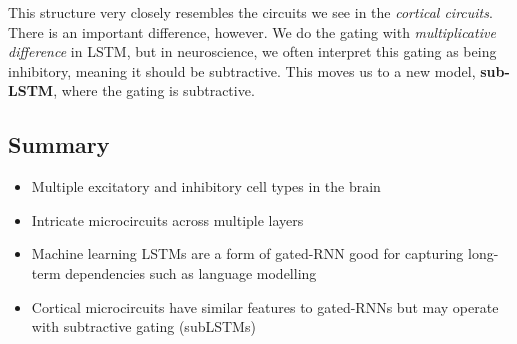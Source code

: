 \documentclass[11pt,a4paper,titlepage,dvipsnames,cmyk]{scrartcl}
\begin{document}
This structure very closely resembles the circuits we see in the \textit{cortical circuits}. There is an important difference, however. We do the gating with \textit{multiplicative difference} in LSTM, but in neuroscience, we often interpret this gating as being inhibitory, meaning it should be subtractive. This moves us to a new model, \textbf{sub-LSTM}, where the gating is subtractive.

\subsection{Summary}
\begin{itemize}
    \item Multiple excitatory and inhibitory cell types in the brain
    \item Intricate microcircuits across multiple layers
    \item Machine learning LSTMs are a form of gated-RNN good for capturing long-term dependencies such as language modelling
    \item Cortical microcircuits have similar features to gated-RNNs but may operate with subtractive gating (subLSTMs)
\end{itemize}
\end{document}
